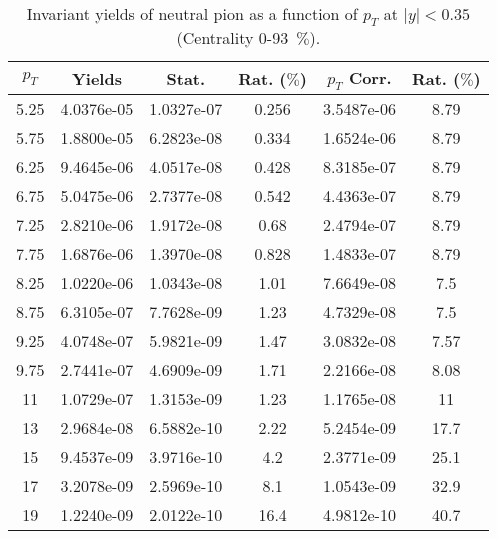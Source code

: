             
\begin{table}[!htb]
\centering
\begin{tabular}{|c|c|c|c|c|c|}
\hline
$p_{T}$ & Yields & Stat. & Rat. ($\%$) & $p_{T}$ Corr. & Rat. ($\%$) \\
\hline
5.25 & 4.0376e-05 & 1.0327e-07 & 0.256 & 3.5487e-06 & 8.79 \\ 
5.75 & 1.8800e-05 & 6.2823e-08 & 0.334 & 1.6524e-06 & 8.79 \\ 
6.25 & 9.4645e-06 & 4.0517e-08 & 0.428 & 8.3185e-07 & 8.79 \\ 
6.75 & 5.0475e-06 & 2.7377e-08 & 0.542 & 4.4363e-07 & 8.79 \\ 
7.25 & 2.8210e-06 & 1.9172e-08 & 0.68 & 2.4794e-07 & 8.79 \\ 
7.75 & 1.6876e-06 & 1.3970e-08 & 0.828 & 1.4833e-07 & 8.79 \\ 
8.25 & 1.0220e-06 & 1.0343e-08 & 1.01 & 7.6649e-08 & 7.5 \\ 
8.75 & 6.3105e-07 & 7.7628e-09 & 1.23 & 4.7329e-08 & 7.5 \\ 
9.25 & 4.0748e-07 & 5.9821e-09 & 1.47 & 3.0832e-08 & 7.57 \\ 
9.75 & 2.7441e-07 & 4.6909e-09 & 1.71 & 2.2166e-08 & 8.08 \\ 
11 & 1.0729e-07 & 1.3153e-09 & 1.23 & 1.1765e-08 & 11 \\ 
13 & 2.9684e-08 & 6.5882e-10 & 2.22 & 5.2454e-09 & 17.7 \\ 
15 & 9.4537e-09 & 3.9716e-10 & 4.2 & 2.3771e-09 & 25.1 \\ 
17 & 3.2078e-09 & 2.5969e-10 & 8.1 & 1.0543e-09 & 32.9 \\ 
19 & 1.2240e-09 & 2.0122e-10 & 16.4 & 4.9812e-10 & 40.7 \\ 
\hline
\end{tabular}
\caption{Invariant yields of neutral pion as a function of $p_{T}$ at $|y|<0.35$ (Centrality 0-93~$\%$).}
\end{table}
            
